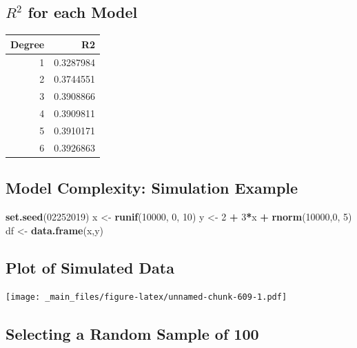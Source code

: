 \documentclass[]{book}
\newenvironment{Shaded}{\begin{snugshade}}{\end{snugshade}}
\newcommand{\KeywordTok}[1]{\textcolor[rgb]{0.13,0.29,0.53}{\textbf{#1}}}
\newcommand{\DecValTok}[1]{\textcolor[rgb]{0.00,0.00,0.81}{#1}}
\newcommand{\StringTok}[1]{\textcolor[rgb]{0.31,0.60,0.02}{#1}}
\newcommand{\OperatorTok}[1]{\textcolor[rgb]{0.81,0.36,0.00}{\textbf{#1}}}
\newcommand{\NormalTok}[1]{#1}
\begin{document}
\subsection{\texorpdfstring{\(R^2\) for each
Model}{R\^{}2 for each Model}}\label{r2-for-each-model}

\begin{tabular}{r|r}
\hline
Degree & R2\\
\hline
1 & 0.3287984\\
\hline
2 & 0.3744551\\
\hline
3 & 0.3908866\\
\hline
4 & 0.3909811\\
\hline
5 & 0.3910171\\
\hline
6 & 0.3926863\\
\hline
\end{tabular}

\subsection{Model Complexity: Simulation
Example}\label{model-complexity-simulation-example}

\begin{Shaded}
\begin{Highlighting}[]
\KeywordTok{set.seed}\NormalTok{(}\DecValTok{02252019}\NormalTok{)}
\NormalTok{x <-}\StringTok{ }\KeywordTok{runif}\NormalTok{(}\DecValTok{10000}\NormalTok{, }\DecValTok{0}\NormalTok{, }\DecValTok{10}\NormalTok{)}
\NormalTok{y <-}\StringTok{ }\DecValTok{2} \OperatorTok{+}\StringTok{ }\DecValTok{3}\OperatorTok{*}\NormalTok{x }\OperatorTok{+}\StringTok{ }\KeywordTok{rnorm}\NormalTok{(}\DecValTok{10000}\NormalTok{,}\DecValTok{0}\NormalTok{, }\DecValTok{5}\NormalTok{)}
\NormalTok{df <-}\StringTok{ }\KeywordTok{data.frame}\NormalTok{(x,y)}
\end{Highlighting}
\end{Shaded}

\subsection{Plot of Simulated Data}\label{plot-of-simulated-data}

\texttt{[image: \_main\_files/figure-latex/unnamed-chunk-609-1.pdf]}

\subsection{Selecting a Random Sample of
100}\label{selecting-a-random-sample-of-100}
\end{document}
